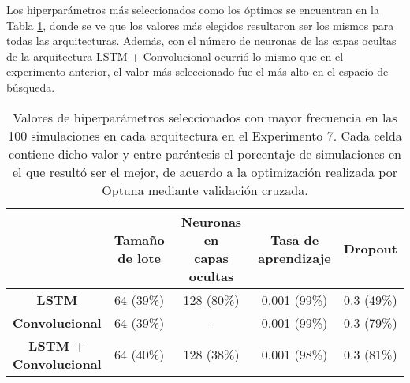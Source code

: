 \documentclass[../../main.tex]{subfiles}
\begin{document}
Los hiperparámetros más seleccionados como los óptimos se encuentran en la Tabla
\ref{tab:hyperparams_exp7}, donde se ve que los valores más elegidos resultaron ser los
mismos para todas las arquitecturas. Además, con el número de neuronas de las capas
ocultas de la arquitectura LSTM + Convolucional ocurrió lo mismo que en el experimento
anterior, el valor más seleccionado fue el más alto en el espacio de búsqueda.

\begin{table}[H]
    \centering
    \renewcommand{\arraystretch}{1.2}
    \label{tab:hyperparams_exp7}
    \begin{tabular}{|c|c|c|c|c|}
        \hline
            & \makecell{\textbf{Tamaño}\\\textbf{de lote}}
            & \makecell{\textbf{Neuronas en}\\\textbf{capas ocultas}}
            & \makecell{\textbf{Tasa de}\\\textbf{aprendizaje}}
            & \textbf{Dropout} \\ \hline\hline
        \textbf{LSTM}
            & 64 (39\%) & 128 (80\%) & 0.001 (99\%) & 0.3 (49\%) \\ \hline
        \textbf{Convolucional}
            & 64 (39\%) & -          & 0.001 (99\%) & 0.3 (79\%) \\ \hline
        \makecell{\textbf{LSTM +}\\\textbf{Convolucional}}
            & 64 (40\%) & 128 (38\%) & 0.001 (98\%) & 0.3 (81\%) \\
        \hline
    \end{tabular}
    \caption{Valores de hiperparámetros seleccionados con mayor frecuencia en las 100
    simulaciones en cada arquitectura en el Experimento 7. Cada celda contiene dicho valor
    y entre paréntesis el porcentaje de simulaciones en el que resultó ser el mejor, de
    acuerdo a la optimización realizada por Optuna mediante validación cruzada.}
\end{table}
\end{document}
